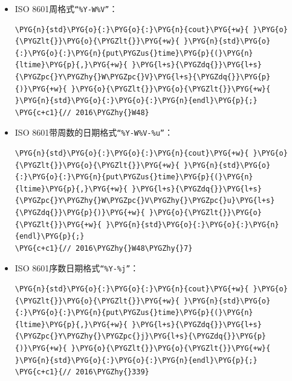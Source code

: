 \begin{itemize}

\item ISO 8601周格式\texttt{“\%Y-\allowbreak{}W\%V”}：



\begin{codeblockbg}
\begin{Verbatim}[commandchars=\\\{\},breaklines=true,breakanywhere=true,fontsize=\codefont,xleftmargin=17bp]
\PYG{n}{std}\PYG{o}{:}\PYG{o}{:}\PYG{n}{cout}\PYG{+w}{ }\PYG{o}{\PYGZlt{}}\PYG{o}{\PYGZlt{}}\PYG{+w}{ }\PYG{n}{std}\PYG{o}{:}\PYG{o}{:}\PYG{n}{put\PYGZus{}time}\PYG{p}{(}\PYG{n}{ltime}\PYG{p}{,}\PYG{+w}{ }\PYG{l+s}{\PYGZdq{}}\PYG{l+s}{\PYGZpc{}Y\PYGZhy{}W\PYGZpc{}V}\PYG{l+s}{\PYGZdq{}}\PYG{p}{)}\PYG{+w}{ }\PYG{o}{\PYGZlt{}}\PYG{o}{\PYGZlt{}}\PYG{+w}{ }\PYG{n}{std}\PYG{o}{:}\PYG{o}{:}\PYG{n}{endl}\PYG{p}{;}
\PYG{c+c1}{// 2016\PYGZhy{}W48}
\end{Verbatim}
\end{codeblockbg}



\item ISO 8601带周数的日期格式\texttt{“\%Y-\allowbreak{}W\%V-\%u”}：



\begin{codeblockbg}
\begin{Verbatim}[commandchars=\\\{\},breaklines=true,breakanywhere=true,fontsize=\codefont,xleftmargin=17bp]
\PYG{n}{std}\PYG{o}{:}\PYG{o}{:}\PYG{n}{cout}\PYG{+w}{ }\PYG{o}{\PYGZlt{}}\PYG{o}{\PYGZlt{}}\PYG{+w}{ }\PYG{n}{std}\PYG{o}{:}\PYG{o}{:}\PYG{n}{put\PYGZus{}time}\PYG{p}{(}\PYG{n}{ltime}\PYG{p}{,}\PYG{+w}{ }\PYG{l+s}{\PYGZdq{}}\PYG{l+s}{\PYGZpc{}Y\PYGZhy{}W\PYGZpc{}V\PYGZhy{}\PYGZpc{}u}\PYG{l+s}{\PYGZdq{}}\PYG{p}{)}\PYG{+w}{ }\PYG{o}{\PYGZlt{}}\PYG{o}{\PYGZlt{}}\PYG{+w}{ }\PYG{n}{std}\PYG{o}{:}\PYG{o}{:}\PYG{n}{endl}\PYG{p}{;}
\PYG{c+c1}{// 2016\PYGZhy{}W48\PYGZhy{}7}
\end{Verbatim}
\end{codeblockbg}



\item ISO 8601序数日期格式\texttt{“\%Y-\%j”}：



\begin{codeblockbg}
\begin{Verbatim}[commandchars=\\\{\},breaklines=true,breakanywhere=true,fontsize=\codefont,xleftmargin=17bp]
\PYG{n}{std}\PYG{o}{:}\PYG{o}{:}\PYG{n}{cout}\PYG{+w}{ }\PYG{o}{\PYGZlt{}}\PYG{o}{\PYGZlt{}}\PYG{+w}{ }\PYG{n}{std}\PYG{o}{:}\PYG{o}{:}\PYG{n}{put\PYGZus{}time}\PYG{p}{(}\PYG{n}{ltime}\PYG{p}{,}\PYG{+w}{ }\PYG{l+s}{\PYGZdq{}}\PYG{l+s}{\PYGZpc{}Y\PYGZhy{}\PYGZpc{}j}\PYG{l+s}{\PYGZdq{}}\PYG{p}{)}\PYG{+w}{ }\PYG{o}{\PYGZlt{}}\PYG{o}{\PYGZlt{}}\PYG{+w}{ }\PYG{n}{std}\PYG{o}{:}\PYG{o}{:}\PYG{n}{endl}\PYG{p}{;}
\PYG{c+c1}{// 2016\PYGZhy{}339}
\end{Verbatim}
\end{codeblockbg}


\end{itemize}
